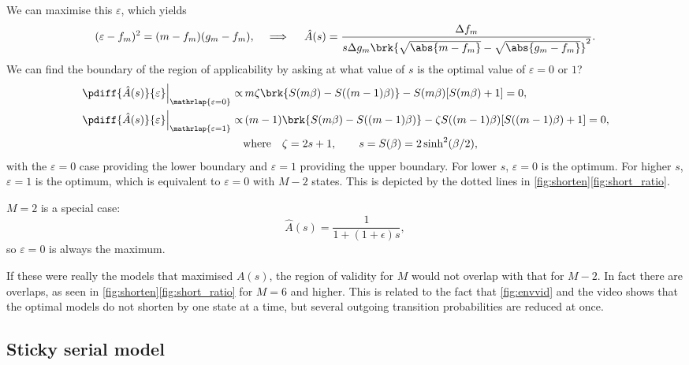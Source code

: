 \documentclass[12pt]{article}
\begin{document}
We can maximise this \wrt \(\varepsilon\), which yields
%
\begin{equation}\label{eq:shortopt}
  (\varepsilon - f_m)^2 = (m - f_m)(g_m - f_m),
  \quad \implies \quad
  \hat{A}(s) = \frac{\Delta f_{m}}
      {s \Delta g_{m} \brk{\sqrt{\abs{m - f_m}} - \sqrt{\abs{g_m - f_m}}}^2}.
\end{equation}
%
We can find the boundary of the region of applicability by asking at what value of \(s\) is the optimal value of \(\varepsilon=0\) or \(1\)?
%
\begin{equation}\label{eq:shortenvalid}
\begin{aligned}
  \left.\pdiff{\hat{A}(s)}{\varepsilon}\right|_{\mathrlap{\varepsilon=0}} \propto &\,
    m \zeta \brk{S(m\beta) - S((m-1)\beta)} - S(m\beta) [S(m\beta) + 1]
      = 0,\\
  \left.\pdiff{\hat{A}(s)}{\varepsilon}\right|_{\mathrlap{\varepsilon=1}} \propto &\,
    (m-1)\brk{S(m\beta) - S((m-1)\beta)} - \zeta S((m-1)\beta) [S((m-1)\beta) + 1]
      = 0,\\
    &\text{where}\quad
    \zeta = 2s + 1, \qquad
    s = S(\beta) = 2 \sinh^2(\beta/2),
\end{aligned}
\end{equation}
%
with the \(\varepsilon=0\) case providing the lower boundary and \(\varepsilon=1\) providing the upper boundary.
For lower \(s\), \(\varepsilon = 0\) is the optimum. 
For higher \(s\), \(\varepsilon = 1\) is the optimum, which is equivalent to \(\varepsilon = 0\) with \(M-2\) states.
This is depicted by the dotted lines in \cref{fig:shorten}\ref{fig:short_ratio}.

\(M=2\) is a special case:
%
\begin{equation*}
  \hat{A}(s) = \frac{1}{1 + (1+\epsilon)s},
\end{equation*}
%
so \(\varepsilon=0\) is always the maximum.

If these were really the models that maximised \(A(s)\), the region of validity for \(M\) would not overlap with that for \(M-2\).
In fact there are overlaps, as seen in \cref{fig:shorten}\ref{fig:short_ratio} for \(M=6\) and higher.
This is related to the fact that \cref{fig:envvid} and the video shows that the optimal models do not shorten by one state at a time, but several outgoing transition probabilities are reduced at once.


\subsection{Sticky serial model}\label{sec:serial_sticky}
\end{document}
